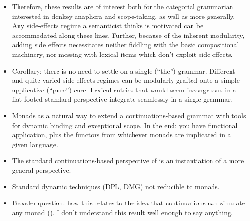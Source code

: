 \begin{itemize}
	\item Therefore, these results are of interest both for the categorial grammarian interested in donkey anaphora and scope-taking, as well as more generally. Any side-effects regime a semanticist thinks is motivated can be accommodated along these lines. Further, because of the inherent modularity, adding side effects necessitates neither fiddling with the basic compositional machinery, nor messing with lexical items which don't exploit side effects.%
	
	\item Corollary: there is no need to settle on a single (``the'') grammar. Different and quite varied side effects regimes can be modularly grafted onto a simple applicative (``pure'') core. Lexical entries that would seem incongruous in a flat-footed standard perspective integrate seamlessly in a single grammar. %
	
	\item Monads as a natural way to extend a continuations-based grammar with tools for dynamic binding and exceptional scope. In the end: you have functional application, plus the functors from whichever monads are implicated in a given language. %
	
	\item The standard continuations-based perspective of \citealt{Barker:2002, ShanBarker:2006, BarkerShan:2014} is an instantiation of a more general perspective.%
	
	\item Standard dynamic techniques (DPL, DMG) not reducible to monads. 
	
	\item Broader question: how this relates to the idea that continuations can simulate any monad (\citealt{Filinski:1994}). I don't understand this result well enough to say anything. %
\end{itemize}

